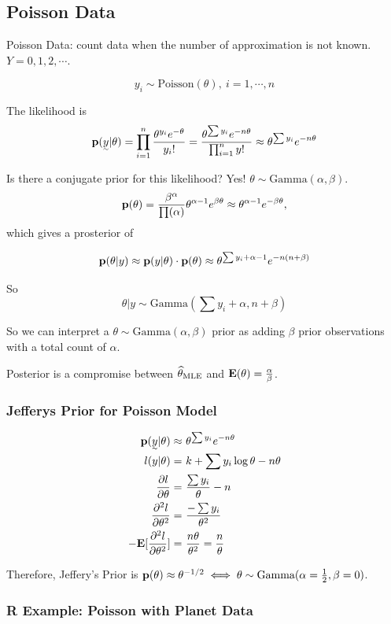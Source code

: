 \subsection{Poisson Data}
Poisson Data: count data when the number of approximation is not known. $Y=0, 1, 2, \cdots$.

\[
y_i \sim \text{Poisson}(\theta), ~i=1, \cdots, n
\]

The likelihood is 
\[
\p(\vec{y}|\theta) 
= \prod_{i=1}^n \frac{\theta^{y_i} e^{-\theta}}{y_i!} 
= \frac{\theta^{\sum y_i} e^{-n\theta}}{\prod_{i=1}^n y!}
\approx \theta^{\sum y_i} e^{-n \theta}
\]

Is there a conjugate prior for this likelihood? Yes! $\theta \sim \text{Gamma}(\alpha, \beta)$.
\[
{\mathbf p}(\theta) = \frac{\beta^{\alpha}}{\prod(\alpha)} \theta^{\alpha-1} e^{\beta \theta} \approx \theta^{\alpha-1} e^{-\beta \theta},
\]
which gives a prosterior of 

\[
{\mathbf p}(\theta|y) \approx {\mathbf p}(y|\theta) \cdot {\mathbf p}(\theta) \approx \theta^{\sum y_i + \alpha - 1} e^{-n(n+\beta)}
\]

So 
\[
\theta|y \sim \text{Gamma}(\sum y_i + \alpha, n + \beta)
\]

So we can interpret a $\theta \sim \text{Gamma}(\alpha, \beta)$ prior as adding $\beta$ prior observations with a total count of $\alpha$.

Posterior is a compromise between $\widehat \theta_{\text{MLE}}$ and ${\mathbf E}(\theta) = \frac{\alpha}{\beta}$.

\subsubsection{Jefferys Prior for Poisson Model}
\begin{align*}
    \p(\vec{y}| \theta) \approx& ~\theta^{\sum y_i} e^{-n\theta}\\
    l(y|\theta) =& ~k + \sum y_i \log \theta - n \theta\\
    \pdv{l}{\theta} =&~ \frac{\sum y_i}{\theta} - n\\
    \pdv[2]{l}{\theta} =&~ \frac{-\sum y_i}{\theta^2}\\
    -\E[\pdv[2]{l}{\theta}] =&~ \frac{n\theta}{\theta^2} = \frac{n}{\theta}
\end{align*}

Therefore, Jeffery's Prior is ${\mathbf p}(\theta) \approx \theta^{-1/2} \iff \theta \sim \text{Gamma}(\alpha=\frac{1}{2}, \beta=0)$.

\subsubsection{R Example: Poisson with Planet Data}

